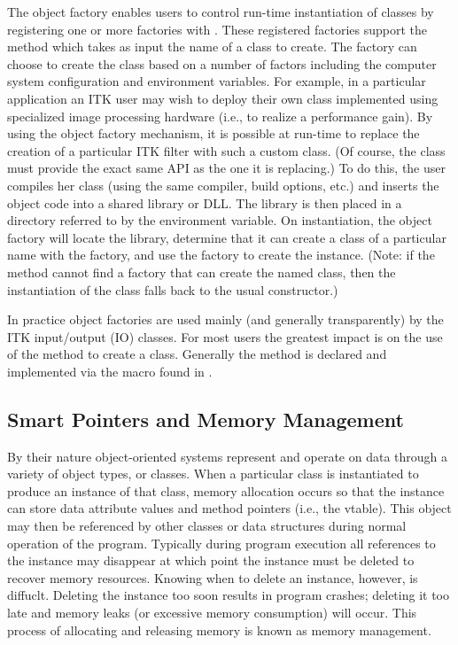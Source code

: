 The object factory enables users to control run-time instantiation of classes
by registering one or more factories with . These
registered factories support the method 
which takes as input the name of a class to create. The factory can choose to
create the class based on a number of factors including the computer system
configuration and environment variables. For example, in a particular
application an ITK user may wish to deploy their own class implemented using
specialized image processing hardware (i.e., to realize a performance
gain). By using the object factory mechanism, it is possible at run-time to
replace the creation of a particular ITK filter with such a custom class. (Of
course, the class must provide the exact same API as the one it is
replacing.) To do this, the user compiles her class (using the same compiler,
build options, etc.) and inserts the object code into a shared library or
DLL. The library is then placed in a directory referred to by the
 environment variable. On instantiation, the object
factory will locate the library, determine that it can create a class of a
particular name with the factory, and use the factory to create the
instance. (Note: if the  method cannot find a factory
that can create the named class, then the instantiation of the class falls
back to the usual constructor.)

In practice object factories are used mainly (and generally transparently) by
the ITK input/output (IO) classes. For most users the greatest impact is on
the use of the  method to create a class. Generally the
 method is declared and implemented via the macro
 found in .


\subsection{Smart Pointers and Memory Management}
\label{sec:SmartPointers}


By their nature object-oriented systems represent and operate on data through
a variety of object types, or classes. When a particular class is
instantiated to produce an instance of that class, memory allocation occurs
so that the instance can store data attribute values and method pointers
(i.e., the vtable). This object may then be referenced by other classes or
data structures during normal operation of the program. Typically during
program execution all references to the instance may disappear at which point
the instance must be deleted to recover memory resources. Knowing when to
delete an instance, however, is diffuclt. Deleting the instance too soon
results in program crashes; deleting it too late and memory leaks (or
excessive memory consumption) will occur. This process of allocating and
releasing memory is known as memory management.

